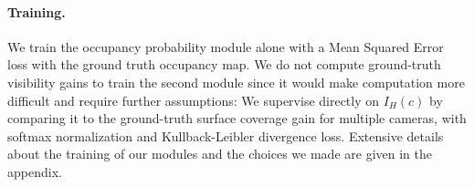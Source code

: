 \paragraph{Training.} We train the occupancy probability module alone with a Mean Squared Error loss with the ground truth occupancy map. We do not compute ground-truth visibility gains to train the second module since it would make computation more difficult and require further assumptions: We supervise directly on $I_H(c)$ by comparing it to the ground-truth surface coverage gain for multiple cameras, with softmax normalization and Kullback-Leibler divergence loss. Extensive details about the training of our modules and the choices we made are given in the appendix.